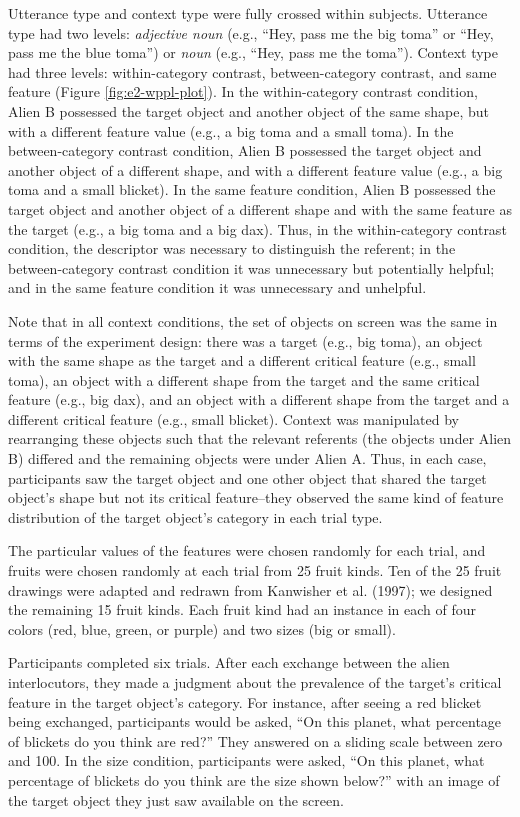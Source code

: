 \documentclass{ucetd}
\begin{document}
Utterance type and context type were fully crossed within subjects.
Utterance type had two levels: \emph{adjective noun} (e.g., ``Hey, pass
me the big toma'' or ``Hey, pass me the blue toma'') or \emph{noun}
(e.g., ``Hey, pass me the toma''). Context type had three levels:
within-category contrast, between-category contrast, and same feature
(Figure \ref{fig:e2-wppl-plot}). In the within-category contrast
condition, Alien B possessed the target object and another object of the
same shape, but with a different feature value (e.g., a big toma and a
small toma). In the between-category contrast condition, Alien B
possessed the target object and another object of a different shape, and
with a different feature value (e.g., a big toma and a small blicket).
In the same feature condition, Alien B possessed the target object and
another object of a different shape and with the same feature as the
target (e.g., a big toma and a big dax). Thus, in the within-category
contrast condition, the descriptor was necessary to distinguish the
referent; in the between-category contrast condition it was unnecessary
but potentially helpful; and in the same feature condition it was
unnecessary and unhelpful.

Note that in all context conditions, the set of objects on screen was
the same in terms of the experiment design: there was a target (e.g.,
big toma), an object with the same shape as the target and a different
critical feature (e.g., small toma), an object with a different shape
from the target and the same critical feature (e.g., big dax), and an
object with a different shape from the target and a different critical
feature (e.g., small blicket). Context was manipulated by rearranging
these objects such that the relevant referents (the objects under Alien
B) differed and the remaining objects were under Alien A. Thus, in each
case, participants saw the target object and one other object that
shared the target object's shape but not its critical feature--they
observed the same kind of feature distribution of the target object's
category in each trial type.

The particular values of the features were chosen randomly for each
trial, and fruits were chosen randomly at each trial from 25 fruit
kinds. Ten of the 25 fruit drawings were adapted and redrawn from
Kanwisher et al. (1997); we designed the remaining 15 fruit kinds. Each
fruit kind had an instance in each of four colors (red, blue, green, or
purple) and two sizes (big or small).

Participants completed six trials. After each exchange between the alien
interlocutors, they made a judgment about the prevalence of the target's
critical feature in the target object's category. For instance, after
seeing a red blicket being exchanged, participants would be asked, ``On
this planet, what percentage of blickets do you think are red?'' They
answered on a sliding scale between zero and 100. In the size condition,
participants were asked, ``On this planet, what percentage of blickets
do you think are the size shown below?'' with an image of the target
object they just saw available on the screen.
\end{document}
